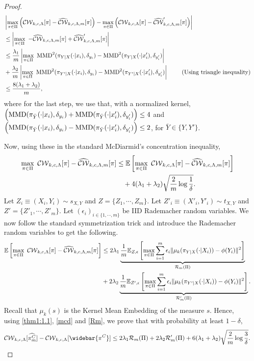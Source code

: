 \begin{proof}
\begin{align}
    &\left|\max_{\pi\in\Pi} \left(\calCW[\pi]-\widehatcalCWm[\pi]\right) - \max_{\pi\in\Pi} \left(\calCW[\pi]-\widehatcalCWm'[\pi]\right)\right| \nonumber \\
    &\leq \left|\max_{\pi\in\Pi}\ -\widehatcalCWm[\pi] + \widehatcalCWm'[\pi]\right| \nonumber\\
    &\leq \frac{\lambda_1}{m}\left|\max_{\pi\in\Pi} \ \MMD^2(\pi_{Y|X}(\cdot|x_i), \delta_{y_i})-\MMD^2(\pi_{Y|X}(\cdot|x'_i), \delta_{y'_i})\right|\nonumber\\&+\frac{\lambda_2}{m}\left|\max_{\pi\in\Pi}\ \MMD^2(\pi_{Y'|X}(\cdot|x_i), \delta_{y_i})-\MMD^2(\pi_{Y'|X}(\cdot|x'_i), \delta_{y'_i})\right| \nonumber 
    \ \tag{Using triangle inequality} \nonumber
    \\
    &\leq \frac{8(\lambda_1+\lambda_2)}{m},
\end{align}
where for the last step, we use that, with a normalized kernel, \newline$\left(\textup{MMD}(\pi_{\bar{Y}}(\cdot|x_i), \delta_{y_i})+\textup{MMD}(\pi_{\bar{Y}}(\cdot|x_i'), \delta_{y_i'})\right)\leq 4$ and \newline $ \left(\textup{MMD}(\pi_{\bar{Y}}(\cdot|x_i), \delta_{y_i})-\textup{MMD}(\pi_{\bar{Y}}(\cdot|x_i'), \delta_{y_i'})\right)\leq 2$, for $\bar{Y}\in\{Y, Y'\}$.

Now, using these in the standard McDiarmid's concentration inequality,
\begin{align}\label{mcd}
    \max_{\pi\in\Pi} \ \calCW[\pi]-\widehatcalCWm[\pi] &\leq \E\left[\max_{\pi\in\Pi} \ \calCW[\pi]-\widehatcalCWm[\pi]\right]\nonumber \\&\quad + 4(\lambda_1+\lambda_2)\sqrt{\frac{2}{m}\log{\frac{1}{\delta}}}.
\end{align}
Let $Z_i\equiv(X_i, Y_i)\sim s_{X,Y}$ and $Z=\{Z_1, \cdots, Z_m\}$. Let $Z'_i\equiv(X'_i, Y'_i)\sim t_{X, Y}$ and $Z'=\{Z'_1, \cdots, Z'_m\}$. Let $(\epsilon_i)_{ i\in\{1, \cdots, m\} }$ be IID Rademacher random variables. We now follow the standard symmetrization trick and introduce the Rademacher random variables to get the following.
\begin{align}
\mathbb{E}\left[\max_{\pi\in\Pi} \ \mathcal{CW}_{k, c, \Lambda}[\pi]-\widehat{\mathcal{CW}}_{k, c, \Lambda, m}[\pi]\right] &\leq 2\lambda_1\underbrace{\frac{1}{m}\mathbb{E}_{Z, \epsilon}\left[\max_{\pi\in\Pi}\sum_{i=1}^m\epsilon_i\|\mu_k(\pi_{Y|X}(\cdot|X_i)) - \phi(Y_i)\|^2\right]}_{\mathcal{R}_{m}(\Pi)} \nonumber \\ &+2\lambda_2\underbrace{\frac{1}{m}\mathbb{E}_{Z', \epsilon}\left[\max_{\pi\in\Pi}\sum_{i=1}^m\epsilon_i\|\mu_k(\pi_{Y'|X}(\cdot|X_i)) - \phi(Y_i)\|^2\right]}_{\mathcal{R}'_{m}(\Pi)}. \label{Rm}
\end{align}
Recall that $\mu_k(s)$ is the Kernel Mean Embedding of the measure $s$. Hence, using \ref{thm1:1.1}, \ref{mcd} and \ref{Rm}, we prove that with probability at least $1-\delta$,
\begin{align}\label{eqn:apppacbound}
 \calCW[\widehat{\pi^C_m}]-\calCW[\widebar{\pi^C}]\leq 2\lambda_1\calR_{m}(\Pi) +2\lambda_2\calR'_{m}(\Pi)+ 6(\lambda_1+\lambda_2)\sqrt{\frac{2}{m}\log{\frac{3}{\delta}}}.
\end{align}


\end{proof}
